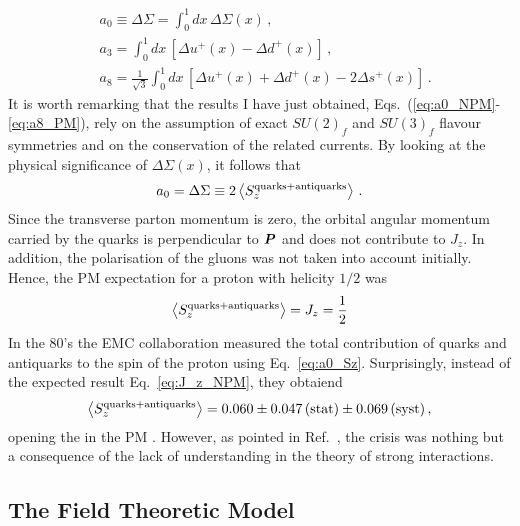 \begin{align}
  & a_0 \equiv \Delta \Sigma = \int_{0}^{1} dx \, \Delta \Sigma(x) \,, 
  \label{eq:a0_NPM}
  \\
  & a_3 = \int_{0}^{1} dx \, \left[ \Delta u^{+}(x) - \Delta d^{+}(x) \right] \,,
  \label{eq:a3_PM}
  \\
  & a_8 = \frac{1}{\sqrt{3}}\int_{0}^{1} dx \, \left[ \Delta u^{+}(x) + \Delta d^{+}(x) - 2 \Delta s^{+}(x) \right] \,.
  \label{eq:a8_PM}
\end{align}
It is worth remarking that the results I have just obtained, Eqs.~(\ref{eq:a0_NPM}-\ref{eq:a8_PM}), rely on the assumption of exact $SU(2)_f$ and $SU(3)_f$ flavour symmetries and on the conservation of the related currents. By looking at the physical significance of $\Delta \Sigma (x)$, it follows that
\begin{equation}
  a_0 = \Delta \Sigma \equiv 2 \left< S_{z}^{\textrm{quarks} + \textrm{antiquarks}} \right> \,.
  \label{eq:a0_Sz}
\end{equation}
Since the transverse parton momentum is zero, the orbital angular momentum carried by the quarks is perpendicular to $\vb*{P}$ and does not contribute to $J_{z}$. In addition, the polarisation of the gluons was not taken into account initially. Hence, the PM expectation for a proton with helicity $1/2$ was 
\begin{equation}
  \left< S_{z}^{\textrm{quarks} + \textrm{antiquarks}} \right> = J_{z} = \frac{1}{2}
  \label{eq:J_z_NPM}
\end{equation}
In the 80's the EMC collaboration measured the total contribution of quarks and antiquarks to the spin of the proton \cite{EuropeanMuon:1989yki} using Eq.~\eqref{eq:a0_Sz}. Surprisingly, instead of the expected result Eq.~\eqref{eq:J_z_NPM}, they obtaiend
\begin{equation}
  \left< S_{z}^{\textrm{quarks} + \textrm{antiquarks}} \right> = 0.060 \pm 0.047 \, (\textrm{stat}) \pm 0.069 \, (\textrm{syst}) \,,
  \label{eq:EMC_exp}
\end{equation}
opening the  in the PM \cite{Leader_Anselmino}. However, as pointed in Ref.~\cite{Leader:2016sli}, the  crisis was nothing but a consequence of the lack of understanding in the theory of strong interactions. 

\subsection{The Field Theoretic Model}
\label{sec:field_theoretic}

